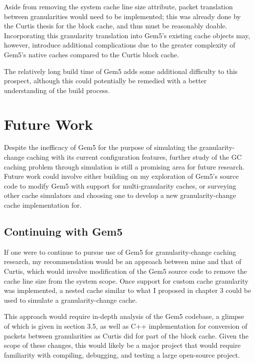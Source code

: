 \documentclass[12pt,twoside]{reedthesis}
\begin{document}
	Aside from removing the system cache line size attribute, packet translation between granularities would need to be implemented; this was already done by the Curtis thesis for the block cache, and thus must be reasonably doable. Incorporating this granularity translation into Gem5's existing cache objects may, however, introduce additional complications due to the greater complexity of Gem5's native caches compared to the Curtis block cache.

	The relatively long build time of Gem5 adds some additional difficulty to this prospect, although this could potentially be remedied with a better understanding of the build process.

\section{Future Work}

	Despite the inefficacy of Gem5 for the purpose of simulating the granularity-change caching with its current configuration features, further study of the GC caching problem through simulation is still a promising area for future research. Future work could involve either building on my exploration of Gem5's source code to modify Gem5 with support for multi-granularity caches, or surveying other cache simulators and choosing one to develop a new granularity-change cache implementation for.

	\subsection*{Continuing with Gem5}

	If one were to continue to pursue use of Gem5 for granularity-change caching research, my recommendation would be an approach between mine and that of Curtis, which would involve modification of the Gem5 source code to remove the cache line size from the system scope. Once support for custom cache granularity was implemented, a nested cache similar to what I proposed in chapter 3 could be used to simulate a granularity-change cache.
	
	This approach would require in-depth analysis of the Gem5 codebase, a glimpse of which is given in section 3.5, as well as C++ implementation for conversion of packets between granularities as Curtis did for part of the block cache. Given the scope of these changes, this would likely be a major project that would require familiarity with compiling, debugging, and testing a large open-source project.
\end{document}
